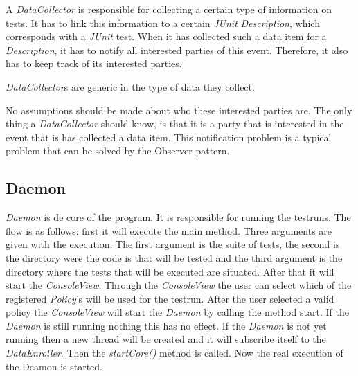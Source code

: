 \documentclass[i2]{oss}
\newcommand{\class}[1]{\emph{#1}}
\newcommand{\method}[1]{\emph{#1}}
\newcommand{\junit}{\emph{JUnit }}
\begin{document}
A \class{DataCollector} is responsible for collecting a certain type of information on tests.
It has to link this information to a certain \junit \class{Description}, which corresponds with a \junit test. 
When it has collected such a data item for a \class{Description}, it has to notify all interested parties of this event.
Therefore, it also has to keep track of its interested parties.

\class{DataCollector}s are generic in the type of data they collect.

No assumptions should be made about who these interested parties are. The only thing a \class{DataCollector} should  know, is that it is a party that is interested in the event that is has collected a data item. This notification problem is a typical problem that can be solved by the Observer pattern.\\



\subsection{Daemon}

\class{Daemon} is de core of the program. It is responsible for running the testruns. The flow is as follows: first it will execute the main method. Three arguments are given with the execution. The first argument is the suite of tests, the second is the directory were the code is that will be tested and the third argument is the directory where the tests that will be executed are situated. After that it will start the \class{ConsoleView}. Through the \class{ConsoleView} the user can select which of the registered \class{Policy}'s will be used for the testrun. After the user selected a valid policy the \class{ConsoleView} will start the \class{Daemon} by calling the method start. If the \class{Daemon} is still running nothing this has no effect. If the \class{Daemon} is not yet running then a new thread will be created and it will subscribe itself to the \class{DataEnroller}. 
Then the \method{startCore()} method is called. Now the real execution of the Deamon is started.
\end{document}
